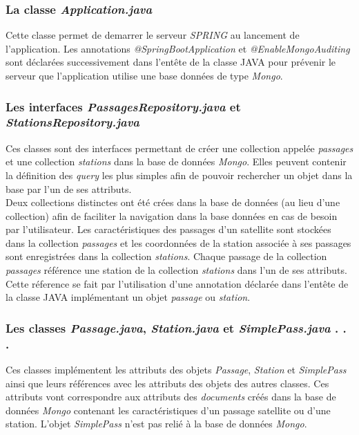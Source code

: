 \documentclass[12pt,fleqn]{book} %
\begin{document}
\subsubsection{La classe \emph{Application.java}}
\noindent Cette classe permet de demarrer le serveur \emph{SPRING} au lancement de l'application. Les annotations \emph{@SpringBootApplication} et \emph{@EnableMongoAuditing} sont déclarées successivement dans l'entête de la classe JAVA pour prévenir le serveur que l'application utilise une base données de type \emph{Mongo}.
\subsubsection{Les interfaces \emph{PassagesRepository.java} et \emph{StationsRepository.java}}
\noindent Ces classes sont des interfaces permettant de créer une collection appelée \emph{passages} et une collection \emph{stations} dans la base de données \emph{Mongo}. Elles peuvent contenir la définition des \emph{query} les plus simples afin de pouvoir rechercher un objet dans la base par l'un de ses attributs.
~\\Deux collections distinctes ont été crées dans la base de données (au lieu d'une collection) afin de faciliter la navigation dans la base données en cas de besoin par l'utilisateur. Les caractéristiques des passages d'un satellite sont stockées dans la collection \emph{passages} et les coordonnées de la station associée à ses passages sont enregistrées dans la collection \emph{stations}. Chaque passage de la collection \emph{passages} référence une station de la collection \emph{stations} dans l'un de ses attributs.
Cette réference se fait par l'utilisation d'une annotation déclarée dans l'entête de la classe JAVA implémentant un objet \emph{passage} ou \emph{station}.
\subsubsection{Les classes \emph{Passage.java}, \emph{Station.java} et \emph{SimplePass.java} \color{white}. . .}
\noindent Ces classes implémentent les attributs des objets \emph{Passage}, \emph{Station} et \emph{SimplePass} ainsi que leurs références avec les attributs des objets des autres classes. Ces attributs vont correspondre aux attributs des \emph{documents} créés dans la base de données \emph{Mongo} contenant les caractéristiques d'un passage satellite ou d'une station. L'objet \emph{SimplePass} n'est pas relié à la base de données \emph{Mongo}.
\end{document}
